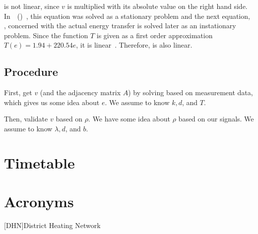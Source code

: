 \documentclass{scrartcl}
\begin{document}
     is not linear, since $v$ is multiplied with its absolute value on the right hand side.
    In~\citeauthor{eimer2022modeling}~(\citeyear{eimer2022modeling})~\cite{eimer2022modeling}, this equation was solved as a stationary problem and the next equation, , concerned with the actual energy transfer is solved later as an instationary problem.
    Since the function $T$ is given as a first order approximation $T(e) = 1.94 + 220.54 e$, it is linear~\cite{eimer2022modeling}.
    Therefore,  is also linear.

    \subsection{Procedure}

    First, get $v$ (and the adjacency matrix $A$) by solving  based on measurement data, which gives us some idea about $e$.
    We assume to know $k, d$, and $T$.

    Then, validate $v$ based on $\rho$.
    We have some idea about $\rho$ based on our signals.
    We assume to know $\lambda, d$, and $b$.

    \printbibliography

    \section{Timetable}

    \section{Acronyms}

    \begin{acronym}
        [DHN]{District Heating Network}
    \end{acronym}
\end{document}
